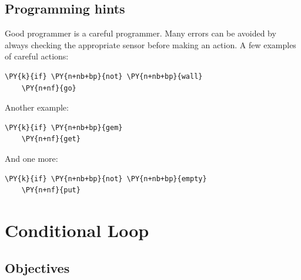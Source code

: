 \noindent

\subsection{Programming hints}

Good programmer is a careful programmer. Many errors can be avoided by always checking the 
appropriate sensor before making an action. A few examples of careful actions:\\
 
\begin{bbox}
\begin{Verbatim}[commandchars=\\\{\}]
\PY{k}{if} \PY{n+nb+bp}{not} \PY{n+nb+bp}{wall}
    \PY{n+nf}{go}
\end{Verbatim}
\end{bbox}
\vspace{6mm}

\noindent
Another example:\\
 
\begin{bbox}
\begin{Verbatim}[commandchars=\\\{\}]
\PY{k}{if} \PY{n+nb+bp}{gem}
    \PY{n+nf}{get}
\end{Verbatim}
\end{bbox}
\vspace{6mm}

\noindent
And one more:\\
 
\begin{bbox}
\begin{Verbatim}[commandchars=\\\{\}]
\PY{k}{if} \PY{n+nb+bp}{not} \PY{n+nb+bp}{empty}
    \PY{n+nf}{put}
\end{Verbatim}
\end{bbox}
\vspace{6mm}

\noindent


\section{Conditional Loop} \label{sec:whilek}

\subsection{Objectives} 
 
